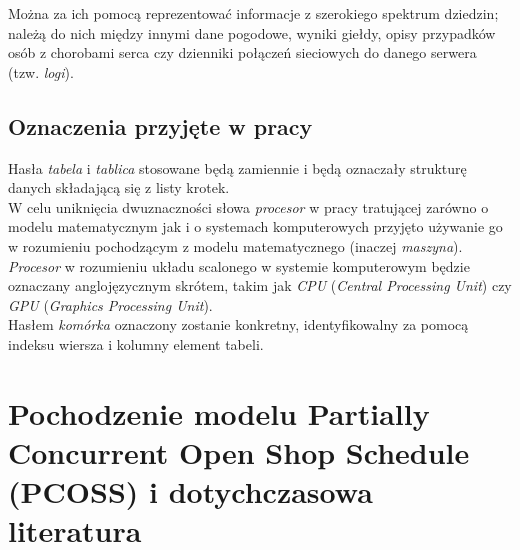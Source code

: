 \documentclass[brudnopis]{xmgr}
\begin{document}
Można za ich pomocą reprezentować informacje z szerokiego spektrum dziedzin; należą do nich między innymi dane pogodowe, wyniki giełdy, opisy przypadków osób z chorobami serca czy dzienniki połączeń sieciowych do danego serwera (tzw. \emph{logi}).

\section{Oznaczenia przyjęte w pracy}

Hasła \emph{tabela} i \emph{tablica} stosowane będą zamiennie i będą oznaczały strukturę danych składającą się z listy krotek. 
\medskip\\

W celu uniknięcia dwuznaczności słowa \emph{procesor} w pracy tratującej zarówno o modelu matematycznym jak i o systemach komputerowych przyjęto używanie go w rozumieniu pochodzącym z modelu matematycznego (inaczej \emph{maszyna}).
\emph{Procesor} w rozumieniu układu scalonego w systemie komputerowym będzie oznaczany anglojęzycznym skrótem, takim jak \emph{CPU} (\emph{Central Processing Unit}) czy \emph{GPU} (\emph{Graphics Processing Unit}).
\medskip\\

Hasłem \emph{komórka} oznaczony zostanie konkretny, identyfikowalny za pomocą indeksu wiersza i kolumny element tabeli.

\chapter{Pochodzenie modelu Partially Concurrent Open Shop Schedule (PCOSS) i dotychczasowa literatura}
\end{document}
